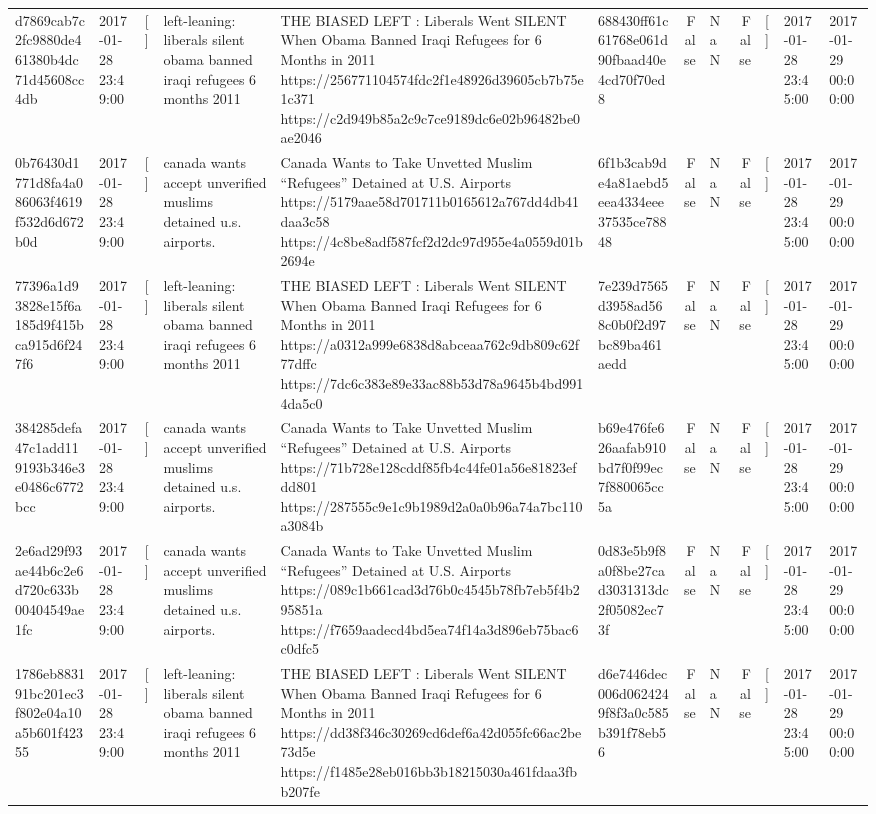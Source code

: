 \begin{tabular}{llllllrlrlll}
d7869cab7c2fc9880de461380b4dc71d45608cc4db & 2017-01-28 23:49:00 & [] & left-leaning: liberals silent obama banned iraqi refugees 6 months 2011 & THE BIASED LEFT : Liberals Went SILENT When Obama Banned Iraqi Refugees for 6 Months in 2011 https://256771104574fdc2f1e48926d39605cb7b75e1c371 https://c2d949b85a2c9c7ce9189dc6e02b96482be0ae2046 & 688430ff61c61768e061d90fbaad40e4cd70f70ed8 & False & NaN & False & [] & 2017-01-28 23:45:00 & 2017-01-29 00:00:00 \\
0b76430d1771d8fa4a086063f4619f532d6d672b0d & 2017-01-28 23:49:00 & [] & canada wants accept unverified muslims detained u.s. airports. & Canada Wants to Take Unvetted Muslim “Refugees” Detained at U.S. Airports https://5179aae58d701711b0165612a767dd4db41daa3c58 https://4c8be8adf587fcf2d2dc97d955e4a0559d01b2694e & 6f1b3cab9de4a81aebd5eea4334eee37535ce78848 & False & NaN & False & [] & 2017-01-28 23:45:00 & 2017-01-29 00:00:00 \\
77396a1d93828e15f6a185d9f415bca915d6f247f6 & 2017-01-28 23:49:00 & [] & left-leaning: liberals silent obama banned iraqi refugees 6 months 2011 & THE BIASED LEFT : Liberals Went SILENT When Obama Banned Iraqi Refugees for 6 Months in 2011 https://a0312a999e6838d8abceaa762c9db809c62f77dffc https://7dc6c383e89e33ac88b53d78a9645b4bd9914da5c0 & 7e239d7565d3958ad568c0b0f2d97bc89ba461aedd & False & NaN & False & [] & 2017-01-28 23:45:00 & 2017-01-29 00:00:00 \\
384285defa47c1add119193b346e3e0486c6772bcc & 2017-01-28 23:49:00 & [] & canada wants accept unverified muslims detained u.s. airports. & Canada Wants to Take Unvetted Muslim “Refugees” Detained at U.S. Airports https://71b728e128cddf85fb4c44fe01a56e81823efdd801 https://287555c9e1c9b1989d2a0a0b96a74a7bc110a3084b & b69e476fe626aafab910bd7f0f99ec7f880065cc5a & False & NaN & False & [] & 2017-01-28 23:45:00 & 2017-01-29 00:00:00 \\
2e6ad29f93ae44b6c2e6d720c633b00404549ae1fc & 2017-01-28 23:49:00 & [] & canada wants accept unverified muslims detained u.s. airports. & Canada Wants to Take Unvetted Muslim “Refugees” Detained at U.S. Airports https://089c1b661cad3d76b0c4545b78fb7eb5f4b295851a https://f7659aadecd4bd5ea74f14a3d896eb75bac6c0dfc5 & 0d83e5b9f8a0f8be27cad3031313dc2f05082ec73f & False & NaN & False & [] & 2017-01-28 23:45:00 & 2017-01-29 00:00:00 \\
1786eb883191bc201ec3f802e04a10a5b601f42355 & 2017-01-28 23:49:00 & [] & left-leaning: liberals silent obama banned iraqi refugees 6 months 2011 & THE BIASED LEFT : Liberals Went SILENT When Obama Banned Iraqi Refugees for 6 Months in 2011 https://dd38f346c30269cd6def6a42d055fc66ac2be73d5e https://f1485e28eb016bb3b18215030a461fdaa3fbb207fe & d6e7446dec006d0624249f8f3a0c585b391f78eb56 & False & NaN & False & [] & 2017-01-28 23:45:00 & 2017-01-29 00:00:00 \\

\end{tabular}
